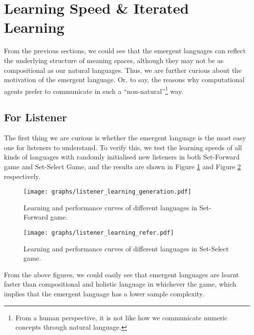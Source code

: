
\section{Learning Speed \& Iterated Learning}
\label{sec4.3:learning_speed}

From the previous sections, we could see that the emergent languages can reflect the underlying structure of meaning spaces, although they may not be as compositional as our natural languages. Thus, we are further curious about the motivation of the emergent language. Or, to say, the reasons why computational agents prefer to communicate in such a ``non-natural''\footnote{From a human perspective, it is not like how we communicate numeric concepts through natural language.} way.

\subsection{For Listener}
\label{ssec4.3.1:learning_listener}

The first thing we are curious is whether the emergent language is the most easy one for listeners to understand. To verify this, we test the learning speeds of all kinds of languages with randomly initialised new listeners in both Set-Forward game and Set-Select Game, and the results are shown in Figure \ref{fig4.1:listener_learning_generation} and Figure \ref{fig4.2:listener_learning_refer} respectively.

\begin{figure}[!h]
    \centering
    \texttt{[image: graphs/listener\_learning\_generation.pdf]}
    \caption{Learning and performance curves of different languages in Set-Forward game.}
    \label{fig4.1:listener_learning_generation}
\end{figure}

\begin{figure}[!h]
    \centering
    \texttt{[image: graphs/listener\_learning\_refer.pdf]}
    \caption{Learning and performance curves of different languages in Set-Select game.}
    \label{fig4.2:listener_learning_refer}
\end{figure}

From the above figures, we could easily see that emergent languages are learnt faster than compositional and holistic language in whichever the game, which implies that the emergent language has a lower sample complexity\cite{vapnik2013nature}.

